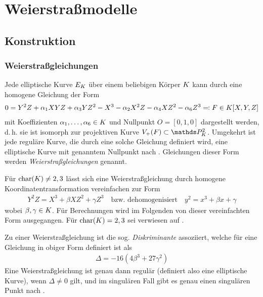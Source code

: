\documentclass[german]{scrreprt}
\begin{document}



\chapter{Weierstraßmodelle}
\section{Konstruktion}
\subsection{Weierstraßgleichungen}
Jede elliptische Kurve $E_{K}$ über einem beliebigen Körper $K$ kann
durch eine homogene Gleichung der Form
\begin{gather*}
  0 = Y^2 Z + \alpha_1 XYZ + \alpha_3 YZ^2 - X^3 - \alpha_2X^2 Z - \alpha_4 XZ^2 - \alpha_6 Z^3
  \eqqcolon F\in K[X,Y,Z]
\end{gather*}
mit Koeffizienten $\alpha_1,\dotsc,\alpha_6\in K$ und Nullpunkt $O=[0,1,0]$
dargestellt werden, d.\,h. sie ist isomorph zur projektiven Kurve
$V_+(F)\subset\P_\K^2$.
Umgekehrt ist jede reguläre Kurve, die durch eine
solche Gleichung definiert wird, eine elliptische Kurve mit genanntem
Nullpunkt nach \cite[Proposition III.3.1]{silverman}.
Gleichungen dieser Form werden \emph{Weierstraßgleichungen} genannt.

Für $\operatorname{char}(K)\neq 2,3$ lässt sich eine Weierstraßgleichung durch
homogene Koordinatentransformation vereinfachen zur Form
\begin{gather*}
  Y^2 Z = X^3 + \beta XZ^2 + \gamma Z^3
  \quad\text{bzw. dehomogenisiert}\quad
  y^2 = x^3 + \beta x + \gamma
\end{gather*}
wobei $\beta,\gamma\in K$.
Für Berechnungen wird im Folgenden von dieser vereinfachten Form
ausgegangen. Für $\operatorname{char}(K)=2,3$ sei verwiesen auf
\cite[Appendix: Elliptic Curves in Characteristics 2 and 3]{silverman}.


Zu einer Weierstraßgleichung ist die sog. \emph{Diskriminante}
assoziiert, welche für eine Gleichung in obiger Form definiert ist als
\begin{gather*}
  \Delta = -16\left(4\beta^3 + 27\gamma^2\right)
\end{gather*}
Eine Weierstraßgleichung ist genau dann regulär (definiert also eine
elliptische Kurve), wenn $\Delta\neq 0$ gilt,
und im singulären Fall gibt es genau einen singulären Punkt
nach \cite[Proposition III.1.4]{silverman}.
\end{document}
